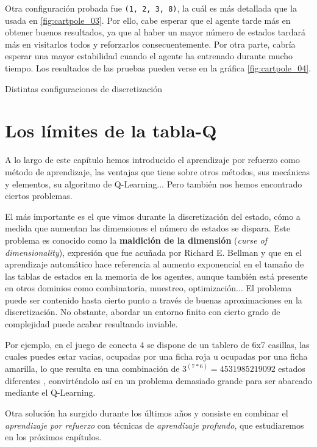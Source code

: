Otra configuración probada fue \texttt{(1, 2, 3, 8)}, la cuál es más detallada que la usada en \ref{fig:cartpole_03}. Por ello, cabe esperar que el agente tarde más en obtener buenos resultados, ya que al haber un mayor número de estados tardará más en visitarlos todos y reforzarlos consecuentemente. Por otra parte, cabría esperar una mayor estabilidad cuando el agente ha entrenado durante mucho tiempo. Los resultados de las pruebas pueden verse en la gráfica \ref{fig:cartpole_04}.

%
       {Distintas configuraciones de discretización}


\section{Los límites de la tabla-Q}

A lo largo de este capítulo hemos introducido el aprendizaje por refuerzo como método de aprendizaje, las ventajas que tiene sobre otros métodos, sus mecánicas y elementos, su algoritmo de Q-Learning... Pero también nos hemos encontrado ciertos problemas.

El más importante es el que vimos durante la discretización del estado, cómo a medida que aumentan las dimensiones el número de estados se dispara. Este problema es conocido como la \textbf{maldición de la dimensión} (\textit{curse of dimensionality}), expresión que fue acuñada por Richard E. Bellman \citep{bellman1957dynamic} \citep{bellman1961adaptive} y que en el aprendizaje automático hace referencia al aumento exponencial en el tamaño de las tablas de estados en la memoria de los agentes, aunque también está presente en otros dominios como combinatoria, muestreo, optimización... El problema puede ser contenido hasta cierto punto a través de buenas aproximaciones en la discretización. No obstante, abordar un entorno finito con cierto grado de complejidad puede acabar resultando inviable.

Por ejemplo, en el juego de conecta 4 se dispone de un tablero de 6x7 casillas, las cuales puedes estar vacias, ocupadas por una ficha roja u ocupadas por una ficha amarilla, lo que resulta en una combinación de $3^{(7*6)} = 4531985219092$ estados diferentes \citep{Edelkamp:2008:SCG:1433357.1433383}, convirténdolo así en un problema demasiado grande para ser abarcado mediante el Q-Learning.

Otra solución ha surgido durante los últimos años y consiste en combinar el \textit{aprendizaje por refuerzo} con técnicas de \textit{aprendizaje profundo}, que estudiaremos en los próximos capítulos.
